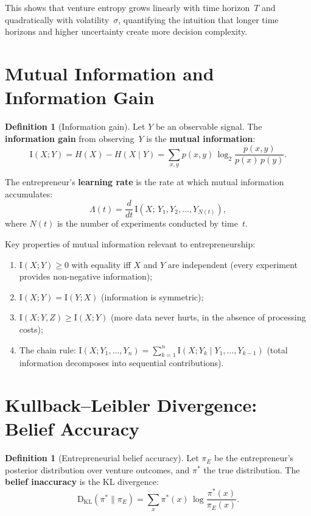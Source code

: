 \documentclass[12pt,a4paper,oneside]{book}
\theoremstyle{definition}
\newtheorem{definition}[theorem]{Definition}
\theoremstyle{remark}
\newcommand{\KL}{\mathrm{D}_{\mathrm{KL}}}
\newcommand{\MI}{\mathrm{I}}
\begin{document}
This shows that venture entropy grows linearly with time horizon~$T$ and
quadratically with volatility~$\sigma$, quantifying the intuition that
longer time horizons and higher uncertainty create more decision complexity.

\section{Mutual Information and Information Gain}

\begin{definition}[Information gain]\label{def:info_gain}
Let $Y$ be an observable signal. The \textbf{information gain} from
observing~$Y$ is the \textbf{mutual information}:
\begin{equation}\label{eq:mutual_info}
  \MI(X; Y) = H(X) - H(X \mid Y)
  = \sum_{x,y} p(x,y)\,\log_2 \frac{p(x,y)}{p(x)\,p(y)}.
\end{equation}
\end{definition}

The entrepreneur's \textbf{learning rate} is the rate at which mutual
information accumulates:
\begin{equation}\label{eq:learning_rate}
  \Lambda(t) = \frac{d}{dt}\,\MI(X;\, Y_1, Y_2, \ldots, Y_{N(t)}),
\end{equation}
where $N(t)$ is the number of experiments conducted by time~$t$.

Key properties of mutual information relevant to entrepreneurship:
\begin{enumerate}[nosep]
  \item $\MI(X; Y) \geq 0$ with equality iff $X$ and $Y$ are independent
    (every experiment provides non-negative information);
  \item $\MI(X; Y) = \MI(Y; X)$ (information is symmetric);
  \item $\MI(X; Y, Z) \geq \MI(X; Y)$ (more data never hurts, in the
    absence of processing costs);
  \item The chain rule: $\MI(X; Y_1, \ldots, Y_n)
    = \sum_{k=1}^n \MI(X; Y_k \mid Y_1, \ldots, Y_{k-1})$ (total
    information decomposes into sequential contributions).
\end{enumerate}

\section{Kullback--Leibler Divergence: Belief Accuracy}

\begin{definition}[Entrepreneurial belief accuracy]
Let $\pi_E$ be the entrepreneur's posterior distribution over venture
outcomes, and $\pi^*$ the true distribution. The \textbf{belief
inaccuracy} is the KL divergence:
\begin{equation}\label{eq:kl}
  \KL(\pi^* \| \pi_E) = \sum_{x} \pi^*(x)\,
    \log \frac{\pi^*(x)}{\pi_E(x)}.
\end{equation}
\end{definition}
\end{document}
